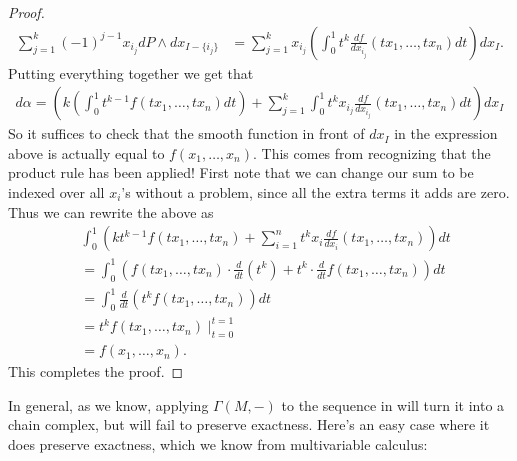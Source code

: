 \documentclass[11pt]{amsart}
\begin{document}
\begin{proof}
\begin{align*}
    \sum_{j=1}^k (-1)^{j-1}x_{i_j} dP\wedge dx_{I\minus\{i_j\}} &= \sum_{j=1}^k x_{i_j} \left( \int_0^1 t^k\frac{df}{dx_{i_j}}(tx_1, \ldots, tx_n) dt \right) dx_I.
\end{align*}
Putting everything together we get that
\begin{align*}
    d\alpha = \left( k \left( \int_0^1 t^{k-1} f(tx_1, \ldots, tx_n) dt \right) + \sum_{j=1}^k \int_0^1 t^k x_{i_j}\frac{df}{dx_{i_j}}(tx_1, \ldots, tx_n) dt\right)dx_I
\end{align*}
So it suffices to check that the smooth function in front of $dx_I$ in the expression above is actually equal to $f(x_1, \ldots, x_n)$. This comes from recognizing that the product rule has been applied! First note that we can change our sum to be indexed over all $x_i$'s without a problem, since all the extra terms it adds are zero. Thus we can rewrite the above as
\begin{align*}
    &\int_0^1 \left( k t^{k-1} f(tx_1, \ldots, tx_n) + \sum_{i=1}^n t^k x_i \frac{df}{dx_i}(tx_1, \ldots, tx_n) \right)dt \\
    &= \int_0^1 \left( f(tx_1, \ldots, tx_n)\cdot\frac{d}{dt}(t^k) + t^k\cdot \frac{d}{dt} f(tx_1, \ldots, tx_n)\right)dt \\
    &= \int_0^1 \frac{d}{dt} \left( t^k f(tx_1, \ldots, tx_n) \right)dt \\
    &= t^k f(tx_1, \ldots, tx_n) \mid_{t=0}^{t=1} \\
    &= f(x_1, \ldots, x_n).
\end{align*}
This completes the proof.
\end{proof}

In general, as we know, applying $\Gamma(M,-)$ to the sequence in  will turn it into a chain complex, but will fail to preserve exactness. Here's an easy case where it does preserve exactness, which we know from multivariable calculus:
\end{document}
